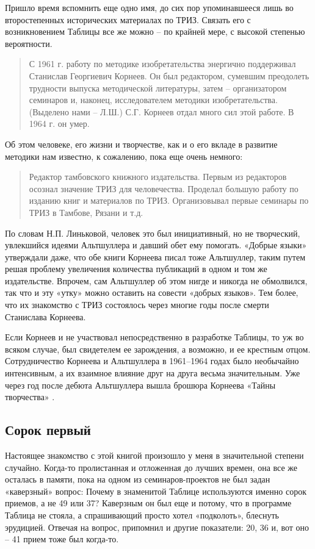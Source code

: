 \documentclass[11pt,a4paper]{article}
\begin{document}
Пришло время вспомнить еще одно имя, до сих пор упоминавшееся лишь во
второстепенных исторических материалах по ТРИЗ. Связать его с возникновением
Таблицы все же можно -- по крайней мере, с высокой степенью вероятности.
\begin{quote}
  С 1961 г. работу по методике изобретательства энергично поддерживал
  Станислав Георгиевич Корнеев. Он был редактором, сумевшим преодолеть
  трудности выпуска методической литературы, затем -- организатором семинаров
  и, наконец, исследователем методики изобретательства. (Выделено нами --
  Л.Ш.) С.Г. Корнеев отдал много сил этой работе. В 1964 г. он умер.
  \cite{Altshuller1974}
\end{quote}
Об этом человеке, его жизни и творчестве, как и о его вкладе в развитие
методики нам известно, к сожалению, пока еще очень немного:
\begin{quote}
  Редактор тамбовского книжного издательства. Первым из редакторов осознал
  значение ТРИЗ для человечества. Проделал большую работу по изданию книг и
  материалов по ТРИЗ. Организовывал первые семинары по ТРИЗ в Тамбове, Рязани
  и т.д.  \cite{Altshuller1996}
\end{quote}
По словам Н.П. Линьковой, человек это был инициативный, но не творческий,
увлекшийся идеями Альтшуллера и давший обет ему помогать. «Добрые языки»
утверждали даже, что обе книги Корнеева писал тоже Альтшуллер, таким путем
решая проблему увеличения количества публикаций в одном и том же издательстве.
Впрочем, сам Альтшуллер об этом нигде и никогда не обмолвился, так что и эту
«утку» можно оставить на совести «добрых языков». Тем более, что их знакомство
с ТРИЗ состоялось через многие годы после смерти Станислава Корнеева.

Если Корнеев и не участвовал непосредственно в разработке Таблицы, то уж во
всяком случае, был свидетелем ее зарождения, а возможно, и ее крестным отцом.
Сотрудничество Корнеева и Альтшуллера в 1961--1964 годах было необычайно
интенсивным, а их взаимное влияние друг на друга весьма значительным. Уже
через год после дебюта Альтшуллера \cite{Altshuller1961} вышла брошюра
Корнеева «Тайны творчества» \cite{Korneev1962}.

\subsection*{Сорок первый}

Настоящее знакомство с этой книгой произошло у меня в значительной степени
случайно. Когда-то пролистанная и отложенная до лучших времен, она все же
осталась в памяти, пока на одном из семинаров-проектов не был задан
«каверзный» вопрос: Почему в знаменитой Таблице используются именно сорок
приемов, а не 49 или 37? Каверзным он был еще и потому, что в программе
Таблица не стояла, а спрашивающий просто хотел «подколоть», блеснуть
эрудицией.  Отвечая на вопрос, припомнил и другие показатели: 20, 36 и, вот
оно -- 41 прием тоже был когда-то.
\end{document}
